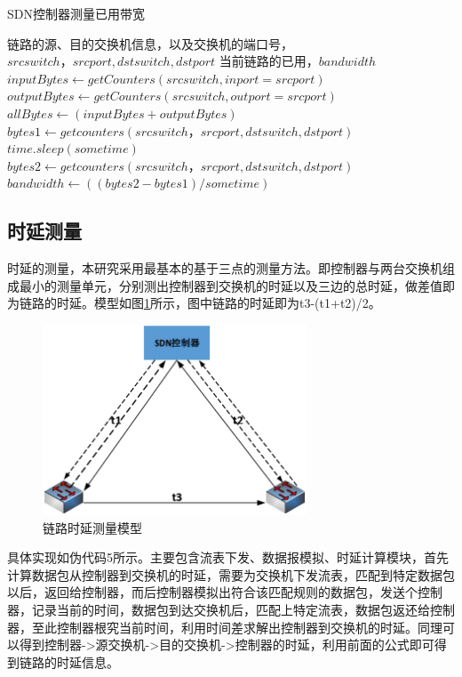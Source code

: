 \begin{algorithm}[!htb]
    \caption{SDN控制器测量已用带宽}
    \begin{algorithmic}[1] %
        \Require 链路的源、目的交换机信息，以及交换机的端口号，$srcswitch，srcport,dstswitch,dstport$
        \Ensure 当前链路的已用，$bandwidth$
        	\State $inputBytes \gets getCounters(srcswitch, inport=srcport)$
        	\State $outputBytes \gets getCounters(srcswitch, outport=srcport)$
        	\State $allBytes \gets (inputBytes+outputBytes)$
        	\State {}
        \EndFunction
        	\State $bytes1 \gets getcounters(srcswitch，srcport, dstswitch,dstport)$
        	\State $time.sleep(sometime)$
        	\State $bytes2 \gets getcounters(srcswitch，srcport, dstswitch,dstport)$
        	\State $bandwidth \gets ((bytes2-bytes1)/sometime)$
         	\State {}
        \EndFunction
    \end{algorithmic}
\end{algorithm}
\subsection{时延测量}
时延的测量，本研究采用最基本的基于三点的测量方法。即控制器与两台交换机组成最小的测量单元，分别测出控制器到交换机的时延以及三边的总时延，做差值即为链路的时延。模型如图\ref{fig:delay}所示，图中链路的时延即为t3-(t1+t2)/2。

\begin{figure}[!htb]
  \centering
  \includegraphics[width=0.7\textwidth]{logo/delay.png}
  \caption{链路时延测量模型}
  \label{fig:delay}
\end{figure}

具体实现如伪代码5所示。主要包含流表下发、数据报模拟、时延计算模块，首先计算数据包从控制器到交换机的时延，需要为交换机下发流表，匹配到特定数据包以后，返回给控制器，而后控制器模拟出符合该匹配规则的数据包，发送个控制器，记录当前的时间，数据包到达交换机后，匹配上特定流表，数据包返还给控制器，至此控制器根究当前时间，利用时间差求解出控制器到交换机的时延。同理可以得到控制器->源交换机->目的交换机->控制器的时延，利用前面的公式即可得到链路的时延信息。

